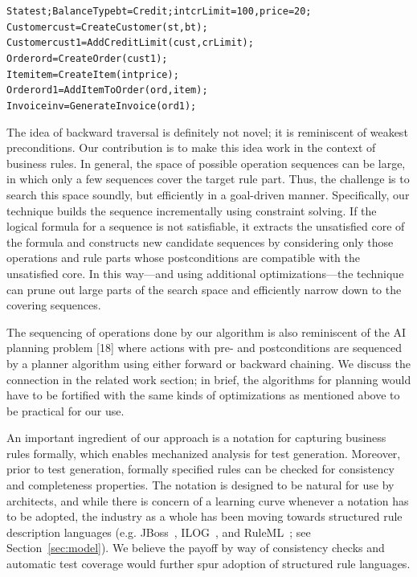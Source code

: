 \vspace*{-4pt}%
{\scriptsize
\begin{alltt}
 State st; BalanceType bt = Credit; int crLimit = 100, price = 20;
 Customer cust = CreateCustomer(st, bt);
 Customer cust1 = AddCreditLimit(cust, crLimit);
 Order ord = CreateOrder(cust1);
 Item item = CreateItem(int price);
 Order ord1 = AddItemToOrder(ord, item);
 Invoice inv = GenerateInvoice(ord1);  
\end{alltt}}%
\vspace*{-5pt}

The idea of backward traversal is definitely not novel; it is reminiscent of
weakest preconditions.  Our contribution is to make this idea work in the
context of business rules.  In general, the space of possible operation
sequences can be large, in which only a few sequences cover the target rule
part. Thus, the challenge is to search this space soundly, but efficiently in a
goal-driven manner. Specifically, our technique builds the sequence
incrementally using constraint solving. If the logical formula for a sequence is
not satisfiable, it extracts the unsatisfied core of the formula and constructs
new candidate sequences by considering only those operations and rule parts
whose postconditions are compatible with the unsatisfied core. In this way---and
using additional optimizations---the technique can prune out large parts of the
search space and efficiently narrow down to the covering sequences.

The sequencing of operations done by our algorithm is also reminiscent of the AI planning 
problem [18] where actions with pre- and postconditions are sequenced by a planner 
algorithm using either forward or backward chaining. We discuss the connection
in the related work section; in brief, the algorithms for planning would have to
be fortified with the same kinds of optimizations as mentioned above to be practical
for our use.

An important ingredient of our approach is a notation for capturing business rules 
formally, which enables
mechanized analysis for test generation. Moreover, prior to test generation,
formally specified rules can be checked for consistency and completeness
properties.  The notation is designed to be natural for use by architects, 
and while there is concern of a learning curve whenever a notation has to be adopted,
the industry as a whole has been moving towards structured rule description
languages (e.g. JBoss~\cite{JBoss}, ILOG~\cite{ILog}, 
and RuleML~\cite{RuleML}; see Section~\ref{sec:model}).  We believe the payoff by way 
of consistency checks and automatic test coverage would further spur adoption of structured rule languages.

